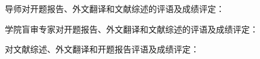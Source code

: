 \cleardoublepage

{
    \bfseries

    {
        \noindent 导师对开题报告、外文翻译和文献综述的评语及成绩评定：
    }

    \vspace{50mm}

    \thesisproposaleval[][][]

    \signature{导师签名}

    {
        \noindent 学院盲审专家对开题报告、外文翻译和文献综述的评语及成绩评定：
    }


    \mbox{} \vfill
    \thesisproposaleval
    \signature{开题报告审核负责人（签名/签章）}
}
{
    \bfseries

    {
        \noindent 对文献综述、外文翻译和开题报告评语及成绩评定：
    }


    \mbox{} \vfill
    \thesisproposaleval
    \signature{开题报告答辩小组负责人（签名）}
}
